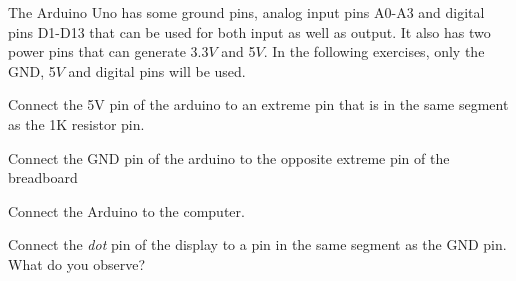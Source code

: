 The Arduino Uno has some ground pins, analog input pins A0-A3 and digital pins D1-D13 that can be used for both input as well as output. It also has two power pins that can generate 3.3$V$ and 5$V$.  In the following exercises, only the GND, 5$V$ and digital pins will be used.
%
%
\begin{problem}
	Connect the 5V pin of the arduino to an  extreme pin that is in the same segment as the 1K resistor pin. 
	\end{problem}	
\begin{problem}
	Connect the GND pin of the arduino to the opposite extreme pin of the breadboard
\end{problem}
\begin{problem}
	Connect the Arduino to the computer.
\end{problem}
\begin{problem}
	Connect the {\em dot} pin of the display to a pin in the same segment as the GND pin.  What do you observe?
\end{problem}
